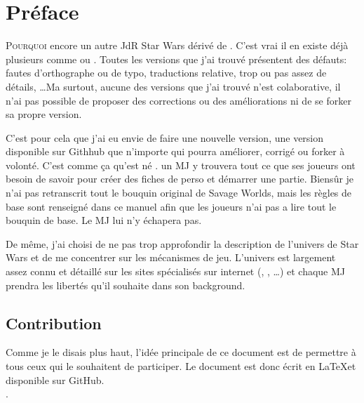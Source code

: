 \onecolumn
\section{Préface}

\lettrine{P}{ourquoi} encore un autre JdR {\jedifont Star Wars} dérivé de . C'est vrai il en existe déjà plusieurs comme  ou . Toutes les versions que j'ai trouvé présentent des défauts: fautes d'orthographe ou de typo, traductions relative, trop ou pas assez de détails, \ldots Ma surtout, aucune des versions que j'ai trouvé n'est colaborative, il n'ai pas possible de proposer des corrections ou des améliorations ni de se forker sa propre version.

C'est pour cela que j'ai eu envie de faire une nouvelle version, une version disponible sur Githhub que n'importe qui pourra améliorer, corrigé ou forker à volonté. C'est comme ça qu'est né \doctitle. un MJ y trouvera tout ce que ses joueurs ont besoin de savoir pour créer des fiches de perso et démarrer une partie. Biensûr je n'ai pas retranscrit tout le bouquin original de Savage Worlds, mais les règles de base sont renseigné dans ce manuel afin que les joueurs n'ai pas a lire tout le bouquin de base. Le MJ lui n'y échapera pas.

De même, j'ai choisi de ne pas trop approfondir la description de l'univers de Star Wars et de me concentrer sur les mécanismes de jeu. L'univers est largement assez connu et détaillé sur les sites spécialisés sur internet (, , \ldots) et chaque MJ prendra les libertés qu'il souhaite dans son background.

\subsection{Contribution}
Comme je le disais plus haut, l'idée principale de ce document est de permettre à tous ceux qui le souhaitent de participer. Le document est donc écrit en \LaTeX et disponible sur GitHub.\\
\cite{website:jdrp-starwars-reloaded}.

\twocolumn